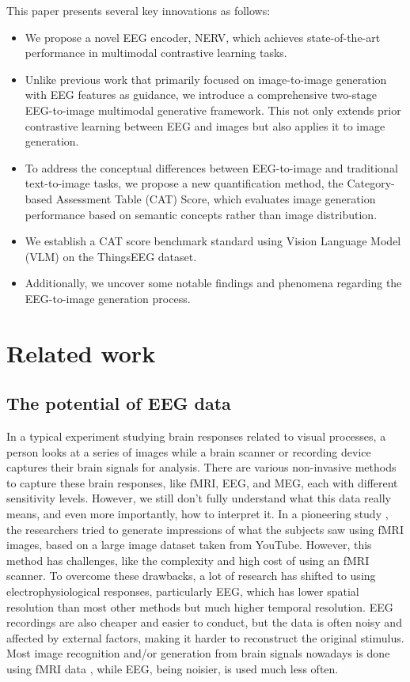 \documentclass{article}
\begin{document}
This paper presents several key innovations as follows:

\begin{itemize}
    \item We propose a novel EEG encoder, NERV, which achieves state-of-the-art performance in multimodal contrastive learning tasks.
    \item Unlike previous work that primarily focused on image-to-image generation with EEG features as guidance, we introduce a comprehensive two-stage EEG-to-image multimodal generative framework. This not only extends prior contrastive learning between EEG and images but also applies it to image generation.
    \item To address the conceptual differences between EEG-to-image and traditional text-to-image tasks, we propose a new quantification method, the Category-based Assessment Table (CAT) Score, which evaluates image generation performance based on semantic concepts rather than image distribution.
    \item We establish a CAT score benchmark standard using Vision Language Model (VLM) on the ThingsEEG dataset.
    \item Additionally, we uncover some notable findings and phenomena regarding the EEG-to-image generation process.
\end{itemize}


\section{Related work}
\label{sec:headings}


\subsection{The potential of EEG data}
In a typical experiment studying brain responses related to visual processes, a person looks at a series of images while a brain scanner or recording device captures their brain signals for analysis. There are various non-invasive methods to capture these brain responses, like fMRI, EEG, and MEG, each with different sensitivity levels. However, we still don't fully understand what this data really means, and even more importantly, how to interpret it. In a pioneering study \cite{NISHIMOTO20111641}, the researchers tried to generate impressions of what the subjects saw using fMRI images, based on a large image dataset taken from YouTube. However, this method has challenges, like the complexity and high cost of using an fMRI scanner. To overcome these drawbacks, a lot of research has shifted to using electrophysiological responses, particularly EEG, which has lower spatial resolution than most other methods but much higher temporal resolution. EEG recordings are also cheaper and easier to conduct, but the data is often noisy and affected by external factors, making it harder to reconstruct the original stimulus. Most image recognition and/or generation from brain signals nowadays is done using fMRI data \cite{zhang_zhang_zhang_kweon_2023}, while EEG, being noisier, is used much less often.
\end{document}
